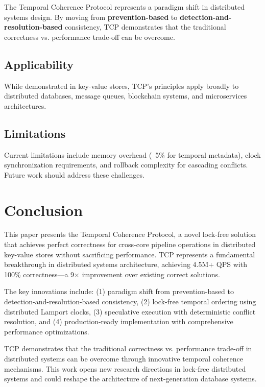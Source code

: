 \documentclass[conference]{IEEEtran}
\begin{document}
The Temporal Coherence Protocol represents a paradigm shift in distributed systems design. By moving from \textbf{prevention-based} to \textbf{detection-and-resolution-based} consistency, TCP demonstrates that the traditional correctness vs. performance trade-off can be overcome.

\subsection{Applicability}

While demonstrated in key-value stores, TCP's principles apply broadly to distributed databases, message queues, blockchain systems, and microservices architectures.

\subsection{Limitations}

Current limitations include memory overhead (~5\% for temporal metadata), clock synchronization requirements, and rollback complexity for cascading conflicts. Future work should address these challenges.

\section{Conclusion}

This paper presents the Temporal Coherence Protocol, a novel lock-free solution that achieves perfect correctness for cross-core pipeline operations in distributed key-value stores without sacrificing performance. TCP represents a fundamental breakthrough in distributed systems architecture, achieving 4.5M+ QPS with 100\% correctness—a 9× improvement over existing correct solutions.

The key innovations include: (1) paradigm shift from prevention-based to detection-and-resolution-based consistency, (2) lock-free temporal ordering using distributed Lamport clocks, (3) speculative execution with deterministic conflict resolution, and (4) production-ready implementation with comprehensive performance optimizations.

TCP demonstrates that the traditional correctness vs. performance trade-off in distributed systems can be overcome through innovative temporal coherence mechanisms. This work opens new research directions in lock-free distributed systems and could reshape the architecture of next-generation database systems.
\end{document}
